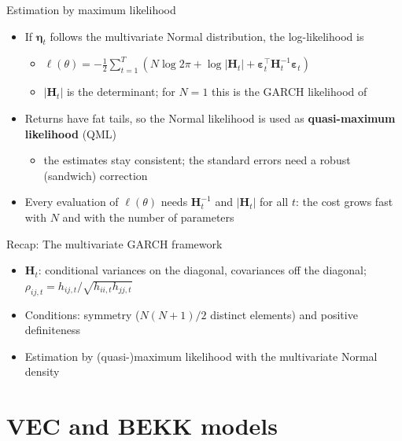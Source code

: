 \begin{frame}{Estimation by maximum likelihood}
\itemsize{\small}
\begin{itemize}
    \item If $\boldsymbol{\eta}_t$ follows the multivariate Normal distribution, the log-likelihood is
    \begin{itemize}
        \item $\ell(\theta) = -\frac12\sum_{t=1}^{T}\left(N\log 2\pi + \log|\mathbf{H}_t| + \boldsymbol{\varepsilon}_t^\top\mathbf{H}_t^{-1}\boldsymbol{\varepsilon}_t\right)$
        \item $|\mathbf{H}_t|$ is the determinant; for $N = 1$ this is the GARCH likelihood of 
    \end{itemize}
    \item Returns have fat tails, so the Normal likelihood is used as \textbf{quasi-maximum likelihood} (QML)
    \begin{itemize}
        \item the estimates stay consistent; the standard errors need a robust (sandwich) correction
    \end{itemize}
    \item Every evaluation of $\ell(\theta)$ needs $\mathbf{H}_t^{-1}$ and $|\mathbf{H}_t|$ for all $t$: the cost grows fast with $N$ and with the number of parameters
\end{itemize}
\end{frame}

\begin{frame}{Recap: The multivariate GARCH framework}
\itemsize{\small}
\begin{itemize}
    \item $\mathbf{H}_t$: conditional variances on the diagonal, covariances off the diagonal; $\rho_{ij,t} = h_{ij,t}/\sqrt{h_{ii,t}h_{jj,t}}$
    \item Conditions: symmetry ($N(N+1)/2$ distinct elements) and positive definiteness
    \item Estimation by (quasi-)maximum likelihood with the multivariate Normal density
\end{itemize}
\end{frame}


\section{VEC and BEKK models}

